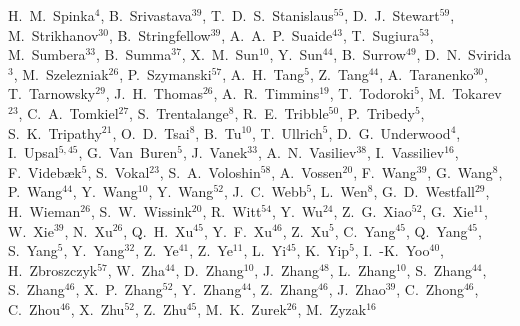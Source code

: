 \documentclass[%
 reprint,	
 amsmath,amssymb,
 aps,
 prc,
]{revtex4-1}
\begin{document}
{H.~M.~Spinka$^{4}$,
B.~Srivastava$^{39}$,
T.~D.~S.~Stanislaus$^{55}$,
D.~J.~Stewart$^{59}$,
M.~Strikhanov$^{30}$,
B.~Stringfellow$^{39}$,
A.~A.~P.~Suaide$^{43}$,
T.~Sugiura$^{53}$,
M.~Sumbera$^{33}$,
B.~Summa$^{37}$,
X.~M.~Sun$^{10}$,
Y.~Sun$^{44}$,
B.~Surrow$^{49}$,
D.~N.~Svirida$^{3}$,
M.~Szelezniak$^{26}$,
P.~Szymanski$^{57}$,
A.~H.~Tang$^{5}$,
Z.~Tang$^{44}$,
A.~Taranenko$^{30}$,
T.~Tarnowsky$^{29}$,
J.~H.~Thomas$^{26}$,
A.~R.~Timmins$^{19}$,
T.~Todoroki$^{5}$,
M.~Tokarev$^{23}$,
C.~A.~Tomkiel$^{27}$,
S.~Trentalange$^{8}$,
R.~E.~Tribble$^{50}$,
P.~Tribedy$^{5}$,
S.~K.~Tripathy$^{21}$,
O.~D.~Tsai$^{8}$,
B.~Tu$^{10}$,
T.~Ullrich$^{5}$,
D.~G.~Underwood$^{4}$,
I.~Upsal$^{5,45}$,
G.~Van~Buren$^{5}$,
J.~Vanek$^{33}$,
A.~N.~Vasiliev$^{38}$,
I.~Vassiliev$^{16}$,
F.~Videb{\ae}k$^{5}$,
S.~Vokal$^{23}$,
S.~A.~Voloshin$^{58}$,
A.~Vossen$^{20}$,
F.~Wang$^{39}$,
G.~Wang$^{8}$,
P.~Wang$^{44}$,
Y.~Wang$^{10}$,
Y.~Wang$^{52}$,
J.~C.~Webb$^{5}$,
L.~Wen$^{8}$,
G.~D.~Westfall$^{29}$,
H.~Wieman$^{26}$,
S.~W.~Wissink$^{20}$,
R.~Witt$^{54}$,
Y.~Wu$^{24}$,
Z.~G.~Xiao$^{52}$,
G.~Xie$^{11}$,
W.~Xie$^{39}$,
N.~Xu$^{26}$,
Q.~H.~Xu$^{45}$,
Y.~F.~Xu$^{46}$,
Z.~Xu$^{5}$,
C.~Yang$^{45}$,
Q.~Yang$^{45}$,
S.~Yang$^{5}$,
Y.~Yang$^{32}$,
Z.~Ye$^{41}$,
Z.~Ye$^{11}$,
L.~Yi$^{45}$,
K.~Yip$^{5}$,
I.~-K.~Yoo$^{40}$,
H.~Zbroszczyk$^{57}$,
W.~Zha$^{44}$,
D.~Zhang$^{10}$,
J.~Zhang$^{48}$,
L.~Zhang$^{10}$,
S.~Zhang$^{44}$,
S.~Zhang$^{46}$,
X.~P.~Zhang$^{52}$,
Y.~Zhang$^{44}$,
Z.~Zhang$^{46}$,
J.~Zhao$^{39}$,
C.~Zhong$^{46}$,
C.~Zhou$^{46}$,
X.~Zhu$^{52}$,
Z.~Zhu$^{45}$,
M.~K.~Zurek$^{26}$,
M.~Zyzak$^{16}$
}
\end{document}

